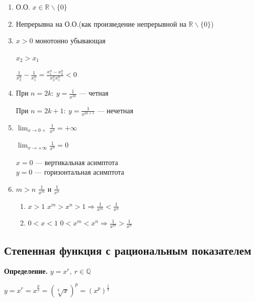 \documentclass{article}
\begin{document}
    \begin{enumerate}
        \item О.О. \( x \in \mathbb{R} \backslash \{0\} \)
        \item Непрерывна на О.О.(как произведение непрерывной на \(\mathbb{R} \backslash \{0\} \))
        \item \( x > 0 \) монотонно убывающая
        
        \( x_2 > x_1 \)

        \( \frac{1}{x_2^n} - \frac{1}{x_1^n} = \frac{x_1^n - x_2^n}{x_2^n x_1^n} < 0 \)
        \item При \( n = 2k:\ y = \frac{1}{x^{2k}} \) --- четная
        
        При \( n = 2k + 1:\ y = \frac{1}{x^{2k + 1}} \) --- нечетная
        
        \item \(\lim_{x \rightarrow 0+} \frac{1}{x^n} = +\infty\)

            \(\lim_{x \rightarrow +\infty} \frac{1}{x^n} = 0\)

            \(x = 0\) --- вертикальная асимптота\\
            \(y = 0\) --- горизонтальная асимптота
        \item \(m > n\) \(\frac{1}{x^m}\) и \(\frac{1}{x^n}\)
            \begin{enumerate}
                \item \(x > 1\) \(x^m > x^n > 1 \Rightarrow \frac{1}{x^m} < \frac{1}{x^n}\)
                \item \(0 < x < 1\) \(0 < x^m < x^n \Rightarrow \frac{1}{x^m} > \frac{1}{x^n}\)
            \end{enumerate}
    \end{enumerate}

    \subsection{Степенная функция с рациональным показателем}

    \textbf{Определение.} \( y = x^r,\ r \in \mathbb{Q} \)

    \( y = x^r = x^{\frac{p}{q}} = (\sqrt[q]{x})^p = (x^p)^{\frac{1}{q}} \)
\end{document}
